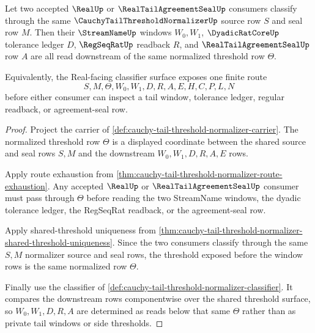 \begin{theorem}
\label{thm:cauchy-tail-threshold-normalizer-real-facing-determinacy}
Let two accepted $\RealUp$ or $\RealTailAgreementSealUp$ consumers classify through the same $\CauchyTailThresholdNormalizerUp$ source row $S$ and seal row $M$. Then their $\StreamNameUp$ windows $W_0,W_1$, $\DyadicRatCoreUp$ tolerance ledger $D$, $\RegSeqRatUp$ readback $R$, and $\RealTailAgreementSealUp$ row $A$ are all read downstream of the same normalized threshold row $\Theta$.

Equivalently, the Real-facing classifier surface exposes one finite route
$$
S,M,\Theta,W_0,W_1,D,R,A,E,H,C,P,L,N
$$
before either consumer can inspect a tail window, tolerance ledger, regular readback, or agreement-seal row.
\end{theorem}
\begin{proof}
Project the carrier of \autoref{def:cauchy-tail-threshold-normalizer-carrier}. The normalized threshold row $\Theta$ is a displayed coordinate between the shared source and seal rows $S,M$ and the downstream $W_0,W_1,D,R,A,E$ rows.

Apply route exhaustion from \autoref{thm:cauchy-tail-threshold-normalizer-route-exhaustion}. Any accepted $\RealUp$ or $\RealTailAgreementSealUp$ consumer must pass through $\Theta$ before reading the two StreamName windows, the dyadic tolerance ledger, the RegSeqRat readback, or the agreement-seal row.

Apply shared-threshold uniqueness from \autoref{thm:cauchy-tail-threshold-normalizer-shared-threshold-uniqueness}. Since the two consumers classify through the same $S,M$ normalizer source and seal rows, the threshold exposed before the window rows is the same normalized row $\Theta$.

Finally use the classifier of \autoref{def:cauchy-tail-threshold-normalizer-classifier}. It compares the downstream rows componentwise over the shared threshold surface, so $W_0,W_1,D,R,A$ are determined as reads below that same $\Theta$ rather than as private tail windows or side thresholds.
\end{proof}

